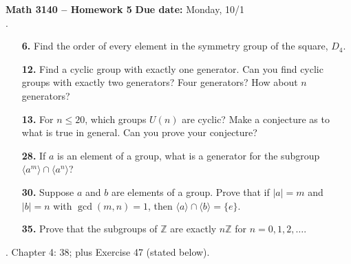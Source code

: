\documentclass[12pt,reqno]{amsart}
\begin{document}
\thispagestyle{empty}

\noindent \textbf{Math 3140 -- Homework 5} \hfill {\bf Due date:} Monday, 10/1\\[4pt]
.

\begin{enumerate}

\item[{\bf 6.}]
Find the order of every element in the symmetry group of the square,
$D_4$.

\bigskip

\item[{\bf 12.}]
Find a cyclic group with exactly one generator.  Can you find cyclic
groups with exactly two generators?  Four generators?  How about $n$
generators?

\bigskip

\item[{\bf 13.}]
For $n \leq 20$, which groups $U(n)$ are cyclic?  Make a conjecture as
to what is true in general.  Can you prove your conjecture?  

\bigskip

\item[{\bf 28.}]
If $a$ is an element of a group, what is a generator for the
subgroup $\langle a^m \rangle  \cap  \langle a^n \rangle $?
 

\bigskip

\item[{\bf 30.}]
Suppose $a$ and $b$ are elements of a group. Prove that if $|a|
= m$ and $|b| = n$ with $\gcd(m,n) = 1$, then $\langle a \rangle  \cap
\langle b \rangle  = \{ e \}$. 
 
\bigskip

\item[{\bf 35.}]
Prove that the subgroups of ${\mathbb Z}$ are exactly $n{\mathbb Z}$ for $n
= 0, 1, 2, \ldots$. 

\end{enumerate}

\bigskip

\bigskip

.  Chapter 4:  38; plus Exercise 47 (stated below).
\end{document}
